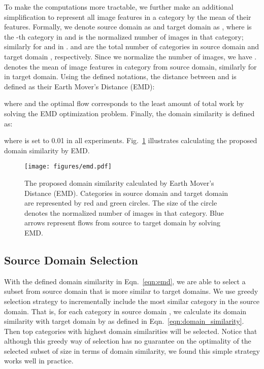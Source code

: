 \documentclass[10pt,twocolumn,letterpaper]{article}
\begin{document}
To make the computations more tractable, we further make an additional simplification to represent all image features in a category by the mean of their features.
Formally, we denote source domain as  and target domain as , where  is the -th category in  and  is the normalized number of images in that category; similarly for  and  in .
 and  are the total number of categories in source domain  and target domain , respectively.
Since we normalize the number of images, we have .
 denotes the mean of image features in category  from source domain, similarly for  in target domain.
Using the defined notations, the distance between  and  is defined as their Earth Mover's Distance (EMD):

where  and the optimal flow   corresponds to the least amount of total work by solving the EMD optimization problem.
Finally, the domain similarity is defined as:

where  is set to 0.01 in all experiments.
Fig.\ \ref{fig:emd} illustrates calculating the proposed domain similarity by EMD.


\begin{figure}[t]
\begin{center}
\texttt{[image: figures/emd.pdf]}
\end{center}
\caption{The proposed domain similarity calculated by Earth Mover's Distance (EMD). Categories in source domain and target domain are represented by red and green circles. The size of the circle denotes the normalized number of images in that category. Blue arrows represent flows from source to target domain by solving EMD.}
\label{fig:emd}
\end{figure}




\subsection{Source Domain Selection}
\label{sec:selection}

With the defined domain similarity in Eqn.\ \ref{eqn:emd}, we are able to select a subset from source domain that is more similar to target domains.
We use greedy selection strategy to incrementally include the most similar category in the source domain.
That is, for each category  in source domain , we calculate its domain similarity with target domain by  as defined in Eqn.\ \ref{eqn:domain_similarity}.
Then top  categories with highest domain similarities will be selected.
Notice that although this greedy way of selection has no guarantee on the optimality of the selected subset of size  in terms of domain similarity, we found this simple strategy works well in practice.
\end{document}
